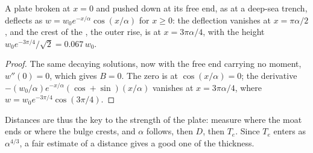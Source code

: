 \begin{proposition}\label{prop:b3:gravity-geodesy:broken}
A plate broken at $x = 0$ and pushed down at its free end, as at a deep-sea
trench, deflects as $w = w_0e^{-x/\alpha}\cos(x/\alpha)$ for $x \ge 0$: the
deflection vanishes at $x = \pi\alpha/2$, and the crest of the , the
outer rise, is at $x = 3\pi\alpha/4$, with the height $w_0e^{-3\pi/4}/\sqrt2 =
\num{0.067}\,w_0$.
\end{proposition}

\begin{proof}
The same decaying solutions, now with the free end carrying no moment,
$w''(0) = 0$, which gives $B = 0$. The zero is at $\cos(x/\alpha) = 0$; the
derivative $-(w_0/\alpha)e^{-x/\alpha}(\cos + \sin)(x/\alpha)$ vanishes at
$x = 3\pi\alpha/4$, where $w = w_0e^{-3\pi/4}\cos(3\pi/4)$.
\end{proof}

Distances are thus the key to the strength of the plate: measure where the moat
ends or where the bulge crests, and $\alpha$ follows, then $D$, then $T_e$.
Since $T_e$ enters as $\alpha^{4/3}$, a fair estimate of a distance gives a good
one of the thickness.

